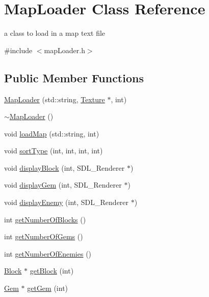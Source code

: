 \hypertarget{class_map_loader}{\section{Map\+Loader Class Reference}
\label{class_map_loader}
}


a class to load in a map text file  




{\ttfamily \#include $<$map\+Loader.\+h$>$}

\subsection*{Public Member Functions}
\begin{DoxyCompactItemize}
\item 
\hyperlink{class_map_loader_a759260eb5a2bcc71f4eb6e03e8d8dead}{Map\+Loader} (std\+::string, \hyperlink{class_texture}{Texture} $\ast$, int)
\item 
\hyperlink{class_map_loader_a6055310649b9a926301d7fb2b83cb1b1}{$\sim$\+Map\+Loader} ()
\item 
void \hyperlink{class_map_loader_aa3f95e47879ef5d2ac8f9b4e80602412}{load\+Map} (std\+::string, int)
\item 
void \hyperlink{class_map_loader_a5d094d7c804670f68e04c360cb9b5965}{sort\+Type} (int, int, int, int)
\item 
void \hyperlink{class_map_loader_a0430f4acdbe19fd6853a61e3b9f71543}{display\+Block} (int, S\+D\+L\+\_\+\+Renderer $\ast$)
\item 
void \hyperlink{class_map_loader_adf524d17cab14e1096341100abfe92b2}{display\+Gem} (int, S\+D\+L\+\_\+\+Renderer $\ast$)
\item 
void \hyperlink{class_map_loader_a15185be5ed6c623ca56d8719eddabe9f}{display\+Enemy} (int, S\+D\+L\+\_\+\+Renderer $\ast$)
\item 
int \hyperlink{class_map_loader_a178ca855ceec126f0a3a2264b74f63cc}{get\+Number\+Of\+Blocks} ()
\item 
int \hyperlink{class_map_loader_a407a5f1ad238e3048b5aaf0a7555c172}{get\+Number\+Of\+Gems} ()
\item 
int \hyperlink{class_map_loader_a553fdab4c534f6b72764545b01f83005}{get\+Number\+Of\+Enemies} ()
\item 
\hyperlink{class_block}{Block} $\ast$ \hyperlink{class_map_loader_a161a0cc6a392abc9baa57e919023f25c}{get\+Block} (int)
\item 
\hyperlink{class_gem}{Gem} $\ast$ \hyperlink{class_map_loader_a9b56fda5f4c27614131b085b449fe183}{get\+Gem} (int)

\end{DoxyCompactItemize}
